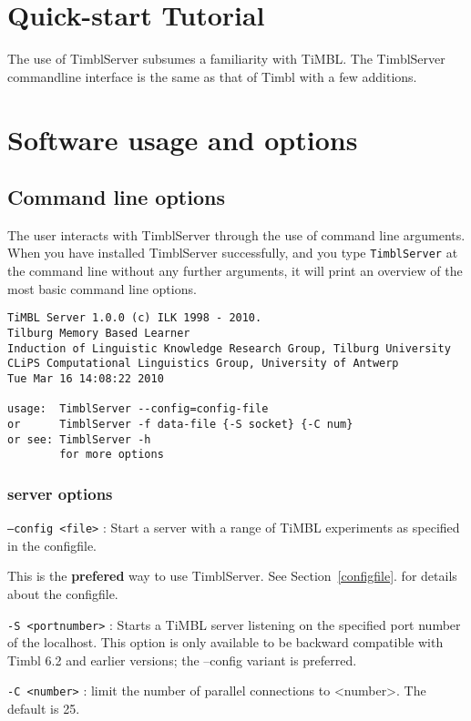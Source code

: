 \documentclass{report}
\begin{document}
\chapter{Quick-start Tutorial}
\label{tutorial}

The use of TimblServer subsumes a familiarity with TiMBL.  The
TimblServer commandline interface is the same as that of Timbl with a
few additions.


\chapter{Software usage and options}
\label{reference}

\section{Command line options}
\label{commandline}

The user interacts with TimblServer through the use of command line
arguments.  When you have installed TimblServer successfully, and you
type {\tt TimblServer} at the command line without any further
arguments, it will print an overview of the most basic command line
options.

{\footnotesize
\begin{verbatim}
TiMBL Server 1.0.0 (c) ILK 1998 - 2010.
Tilburg Memory Based Learner
Induction of Linguistic Knowledge Research Group, Tilburg University
CLiPS Computational Linguistics Group, University of Antwerp
Tue Mar 16 14:08:22 2010

usage:  TimblServer --config=config-file
or      TimblServer -f data-file {-S socket} {-C num}
or see: TimblServer -h
        for more options
\end{verbatim}
}

\subsection{server options}

\begin{description}

\item {\tt --config <file>} : Start a server with a range of TiMBL experiments as specified in the configfile.

This is the {\bf prefered} way to use TimblServer. See Section~\ref{configfile}. for details about the configfile.

\item {\tt -S <portnumber>} : Starts a TiMBL server listening on the
  specified port number of the localhost.  This option is only
  available to be backward compatible with Timbl 6.2 and earlier
  versions; the --config variant is preferred.
\item {\tt -C <number>} : limit the number of parallel connections to
  <number>. The default is 25.

\end{description}
\end{document}
